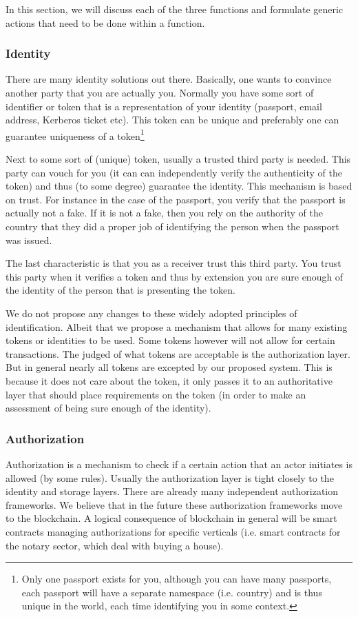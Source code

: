 \documentclass{article}
\begin{document}
In this section, we will discuss each of the three functions and formulate generic actions that need to be done within a function.

\subsubsection{Identity}
There are many identity solutions out there. Basically, one wants to convince another party that you are actually you. Normally you have some sort of identifier or token that is a representation of your identity (passport, email address, Kerberos ticket etc). This token can be unique and preferably one can guarantee uniqueness of a token\footnote{Only one passport exists for you, although you can have many passports, each passport will have a separate namespace (i.e. country) and is thus unique in the world, each time identifying you in some context.}

Next to some sort of (unique) token, usually a trusted third party is needed. This party can vouch for you (it can can independently verify the authenticity of the token) and thus (to some degree) guarantee the identity. This mechanism is based on trust. For instance in the case of the passport, you verify that the passport is actually not a fake. If it is not a fake, then you rely on the authority of the country that they did a proper job of identifying the person when the passport was issued.

The last characteristic is that you as a receiver trust this third party. You trust this party when it verifies a token and thus by extension you are sure enough of the identity of the person that is presenting the token. 

We do not propose any changes to these widely adopted principles of identification. Albeit that we propose a mechanism that allows for many existing tokens or identities to be used. Some tokens however will not allow for certain transactions. The judged of what tokens are acceptable is the authorization layer. But in general nearly all tokens are excepted by our proposed system. This is because it does not care about the token, it only passes it to an authoritative layer that should place requirements on the token (in order to make an assessment of being sure enough of the identity).

\subsubsection{Authorization}
Authorization is a mechanism to check if a certain action that an actor initiates is allowed (by some rules). Usually the authorization layer is tight closely to the identity and storage layers. There are already many independent authorization frameworks. We believe that in the future these authorization frameworks move to the blockchain. A logical consequence of blockchain in general will be smart contracts managing authorizations for specific verticals (i.e. smart contracts for the notary sector, which deal with buying a house).
\end{document}
